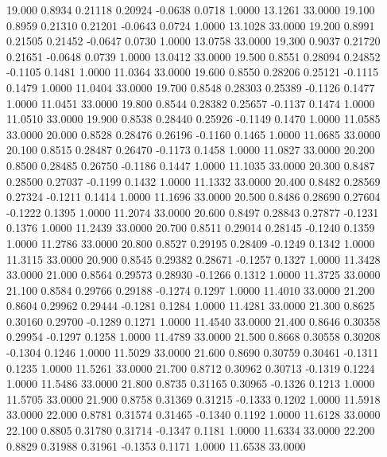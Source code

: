   19.000   0.8934   0.21118   0.20924  -0.0638   0.0718   1.0000  13.1261  33.0000
  19.100   0.8959   0.21310   0.21201  -0.0643   0.0724   1.0000  13.1028  33.0000
  19.200   0.8991   0.21505   0.21452  -0.0647   0.0730   1.0000  13.0758  33.0000
  19.300   0.9037   0.21720   0.21651  -0.0648   0.0739   1.0000  13.0412  33.0000
  19.500   0.8551   0.28094   0.24852  -0.1105   0.1481   1.0000  11.0364  33.0000
  19.600   0.8550   0.28206   0.25121  -0.1115   0.1479   1.0000  11.0404  33.0000
  19.700   0.8548   0.28303   0.25389  -0.1126   0.1477   1.0000  11.0451  33.0000
  19.800   0.8544   0.28382   0.25657  -0.1137   0.1474   1.0000  11.0510  33.0000
  19.900   0.8538   0.28440   0.25926  -0.1149   0.1470   1.0000  11.0585  33.0000
  20.000   0.8528   0.28476   0.26196  -0.1160   0.1465   1.0000  11.0685  33.0000
  20.100   0.8515   0.28487   0.26470  -0.1173   0.1458   1.0000  11.0827  33.0000
  20.200   0.8500   0.28485   0.26750  -0.1186   0.1447   1.0000  11.1035  33.0000
  20.300   0.8487   0.28500   0.27037  -0.1199   0.1432   1.0000  11.1332  33.0000
  20.400   0.8482   0.28569   0.27324  -0.1211   0.1414   1.0000  11.1696  33.0000
  20.500   0.8486   0.28690   0.27604  -0.1222   0.1395   1.0000  11.2074  33.0000
  20.600   0.8497   0.28843   0.27877  -0.1231   0.1376   1.0000  11.2439  33.0000
  20.700   0.8511   0.29014   0.28145  -0.1240   0.1359   1.0000  11.2786  33.0000
  20.800   0.8527   0.29195   0.28409  -0.1249   0.1342   1.0000  11.3115  33.0000
  20.900   0.8545   0.29382   0.28671  -0.1257   0.1327   1.0000  11.3428  33.0000
  21.000   0.8564   0.29573   0.28930  -0.1266   0.1312   1.0000  11.3725  33.0000
  21.100   0.8584   0.29766   0.29188  -0.1274   0.1297   1.0000  11.4010  33.0000
  21.200   0.8604   0.29962   0.29444  -0.1281   0.1284   1.0000  11.4281  33.0000
  21.300   0.8625   0.30160   0.29700  -0.1289   0.1271   1.0000  11.4540  33.0000
  21.400   0.8646   0.30358   0.29954  -0.1297   0.1258   1.0000  11.4789  33.0000
  21.500   0.8668   0.30558   0.30208  -0.1304   0.1246   1.0000  11.5029  33.0000
  21.600   0.8690   0.30759   0.30461  -0.1311   0.1235   1.0000  11.5261  33.0000
  21.700   0.8712   0.30962   0.30713  -0.1319   0.1224   1.0000  11.5486  33.0000
  21.800   0.8735   0.31165   0.30965  -0.1326   0.1213   1.0000  11.5705  33.0000
  21.900   0.8758   0.31369   0.31215  -0.1333   0.1202   1.0000  11.5918  33.0000
  22.000   0.8781   0.31574   0.31465  -0.1340   0.1192   1.0000  11.6128  33.0000
  22.100   0.8805   0.31780   0.31714  -0.1347   0.1181   1.0000  11.6334  33.0000
  22.200   0.8829   0.31988   0.31961  -0.1353   0.1171   1.0000  11.6538  33.0000
